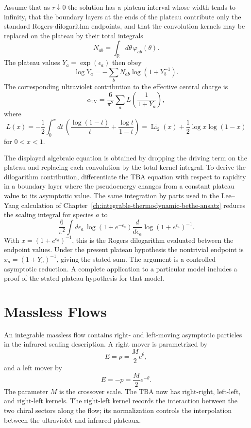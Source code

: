 \begin{controlledapproximation}
\label{ca:tba-plateau-reduction}
Assume that as \(r\downarrow0\) the solution has a plateau interval whose
width tends to infinity, that the boundary layers at the ends of the plateau
contribute only the standard Rogers-dilogarithm endpoints, and that the
convolution kernels may be replaced on the plateau by their total integrals
\[
  N_{ab}=\int_{\mathbb R}d\theta\,\varphi_{ab}(\theta).
\]
The plateau values \(Y_a=\exp(\epsilon_a)\) then obey
\[
  \log Y_a=-\sum_b N_{ab}\log(1+Y_b^{-1}).
\]
The corresponding ultraviolet contribution to the effective central charge is
\[
  c_{\mathrm{UV}}
  =
  \frac{6}{\pi^2}\sum_a
  L\!\left(\frac{1}{1+Y_a}\right),
\]
where
\[
  L(x)
  =
  -\frac12\int_0^x dt\,
  \left(
  \frac{\log(1-t)}{t}
  +\frac{\log t}{1-t}
  \right)
  =
  \operatorname{Li}_2(x)+\frac12\log x\log(1-x)
\]
for \(0<x<1\).
\end{controlledapproximation}

The displayed algebraic equation is obtained by dropping the driving term on
the plateau and replacing each convolution by the total kernel integral.  To
derive the dilogarithm contribution, differentiate the TBA equation with
respect to rapidity in a boundary layer where the pseudoenergy changes from a
constant plateau value to its asymptotic value.  The same integration by
parts used in the Lee--Yang calculation of
Chapter~\ref{ch:integrable-thermodynamic-bethe-ansatz} reduces the scaling
integral for species \(a\) to
\[
  \frac{6}{\pi^2}
  \int d\epsilon_a\,
  \log(1+e^{-\epsilon_a})
  \frac{d}{d\epsilon_a}
  \log(1+e^{\epsilon_a})^{-1}.
\]
With \(x=(1+e^{\epsilon_a})^{-1}\), this is the Rogers dilogarithm evaluated
between the endpoint values.  Under the present plateau hypothesis the
nontrivial endpoint is \(x_a=(1+Y_a)^{-1}\), giving the stated sum.  The
argument is a controlled asymptotic reduction.  A complete application to a
particular model includes a proof of the stated plateau hypothesis for that
model.

\section{Massless Flows}

An integrable massless flow contains right- and left-moving asymptotic
particles in the infrared scaling description.  A right mover is
parametrized by
\[
  E=p=\frac{M}{2}e^\theta ,
\]
and a left mover by
\[
  E=-p=\frac{M}{2}e^{-\theta}.
\]
The parameter \(M\) is the crossover scale.  The TBA now has right-right,
left-left, and right-left kernels.  The right-left kernel records the
interaction between the two chiral sectors along the flow; its normalization
controls the interpolation between the ultraviolet and infrared plateaux.

